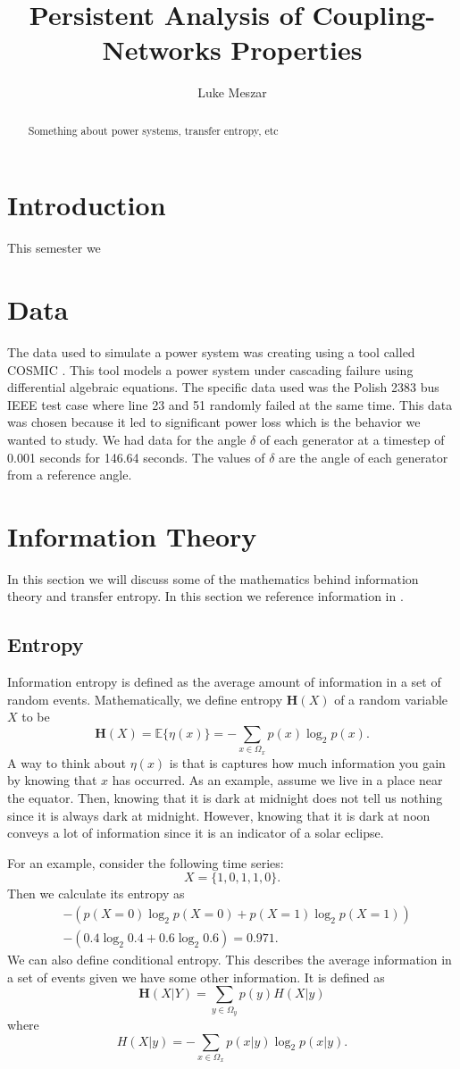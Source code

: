 \documentclass{article}
\title{Persistent Analysis of Coupling-Networks Properties}
\author{Luke Meszar}
\date{}
\theoremstyle{definition}
\newcommand{\Hb}{\mathbf{H}}
\newcommand{\E}{\mathbb{E}}
\begin{document}
\maketitle
\tableofcontents
\pagebreak
\begin{abstract}
    Something about power systems, transfer entropy, etc
\end{abstract}
\section{Introduction}
This semester we 
\section{Data}\label{sec:data}
The data used to simulate a power system was creating using a tool called COSMIC \cite{song2016dynamic}. This tool models a power system under cascading failure using differential algebraic equations. The specific data used was the Polish 2383 bus IEEE test case where line 23 and 51 randomly failed at the same time. This data was chosen because it led to significant power loss which is the behavior we wanted to study. We had data for the angle $\delta$ of each generator at a timestep of 0.001 seconds for 146.64 seconds. The values of $\delta$ are the angle of each generator from a reference angle.  
\section{Information Theory}
In this section we will discuss some of the mathematics behind information theory and transfer entropy. In this section we reference information in \cite{bossomaier2016introduction}.
\subsection{Entropy}
Information entropy is defined as the average amount of information in a set of random events. Mathematically, we define entropy $\Hb(X)$ of a random variable $X$ to be
\[\Hb(X) = \E\{\eta(x)\} = -\sum_{x \in \Omega_x}p(x)\log_2p(x).\]
A way to think about $\eta(x)$ is that is captures how much information you gain by knowing that $x$ has occurred. As an example, assume we live in a place near the equator. Then, knowing that it is dark at midnight does not tell us nothing since it is always dark at midnight. However, knowing that it is dark at noon conveys a lot of information since it is an indicator of a solar eclipse.

For an example, consider the following time series:
\[X = \{1,0,1,1,0\}.\]
Then we calculate its entropy as 
\begin{align*}
&-\left(p(X = 0)\log_2p(X = 0)+p(X = 1)\log_2p(X = 1)\right) \\
&-(0.4\log_2 0.4 + 0.6\log_2 0.6) = 0.971. 
\end{align*}
We can also define conditional entropy. This describes the average information in a set of events given we have some other information. It is defined as
\[\Hb(X | Y) = \sum_{y \in \Omega_y}p(y) H(X|y)\]
where
\[H(X|y) = -\sum_{x \in \Omega_x} p(x|y)\log_2 p(x|y).\]
\end{document}
